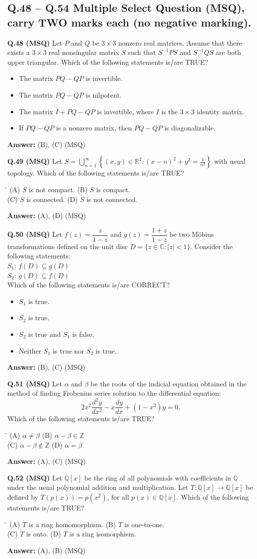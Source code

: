 \documentclass[11pt,a4paper]{article}
\newcommand{\optsfourA}[4]{%
  \begin{tabbing}
    \hspace{0.48\linewidth}\=\kill
    (A) #1 \> (B) #2 \\[2pt]
    (C) #3 \> (D) #4
  \end{tabbing}%
}
\newcommand{\optslistA}[4]{%
  \begin{itemize}
    \setlength{\itemsep}{2pt}\setlength{\parskip}{0pt}
    \item[(A)] #1
    \item[(B)] #2
    \item[(C)] #3
    \item[(D)] #4
  \end{itemize}%
}
\newcommand{\ans}[1]{\textbf{Answer:} #1\par\medskip}
\begin{document}
\subsection*{Q.48 -- Q.54 Multiple Select Question (MSQ), carry TWO marks each (no negative marking).}

\textbf{Q.48 (MSQ)} Let $P$ and $Q$ be $3 \times 3$ nonzero real matrices. Assume that there exists a $3 \times 3$ real nonsingular matrix $S$ such that $S^{-1}PS$ and $S^{-1}QS$ are both upper triangular. Which of the following statements is/are TRUE?
\optslistA{The matrix $PQ - QP$ is invertible.}{The matrix $PQ - QP$ is nilpotent.}{The matrix $I + PQ - QP$ is invertible, where $I$ is the $3 \times 3$ identity matrix.}{If $PQ - QP$ is a nonzero matrix, then $PQ - QP$ is diagonalizable.}
\ans{(B), (C) (MSQ)}

\textbf{Q.49 (MSQ)} Let $S = \bigcup_{n=1}^{\infty} \left\{(x, y) \in \mathbb{R}^2 : (x - n)^2 + y^2 = \frac{1}{n^2}\right\}$ with usual topology. Which of the following statements is/are TRUE?
\optsfourA{$S$ is not compact.}{$S$ is compact.}{$S$ is connected.}{$S$ is not connected.}
\ans{(A), (D) (MSQ)}

\textbf{Q.50 (MSQ)} Let $f(z) = \dfrac{z}{1 - z}$ and $g(z) = \dfrac{1 + z}{1 - z}$ be two M\"obius transformations defined on the unit disc $D = \{z \in \mathbb{C} : |z| < 1\}$. Consider the following statements:\\
$S_1$: $f(D) \subseteq g(D)$\\
$S_2$: $g(D) \subseteq f(D)$\\
Which of the following statements is/are CORRECT?
\optslistA{$S_1$ is true.}{$S_2$ is true.}{$S_2$ is true and $S_1$ is false.}{Neither $S_1$ is true nor $S_2$ is true.}
\ans{(B), (C) (MSQ)}

\textbf{Q.51 (MSQ)} Let $\alpha$ and $\beta$ be the roots of the indicial equation obtained in the method of finding Frobenius series solution to the differential equation:
\[
  2x^2 \frac{d^2 y}{dx^2} - x \frac{dy}{dx} + (1 - x^2)y = 0.
\]
Which of the following statements is/are TRUE?
\optsfourA{$\alpha \ne \beta$}{$\alpha - \beta \in \mathbb{Z}$}{$\alpha - \beta \notin \mathbb{Z}$}{$\alpha = \beta$}
\ans{(A), (C) (MSQ)}

\textbf{Q.52 (MSQ)} Let $\mathbb{Q}[x]$ be the ring of all polynomials with coefficients in $\mathbb{Q}$ under the usual polynomial addition and multiplication. Let $T : \mathbb{Q}[x] \to \mathbb{Q}[x]$ be defined by $T(p(x)) = p(x^2)$, for all $p(x) \in \mathbb{Q}[x]$. Which of the following statements is/are TRUE?
\optsfourA{$T$ is a ring homomorphism.}{$T$ is one-to-one.}{$T$ is onto.}{$T$ is a ring isomorphism.}
\ans{(A), (B) (MSQ)}
\end{document}
